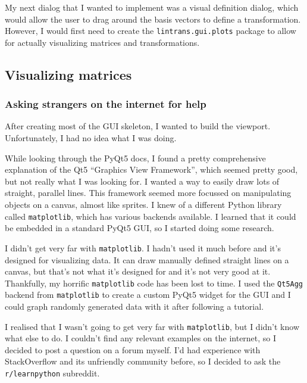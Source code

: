 \documentclass[../main.tex]{subfiles}
\begin{document}
My next dialog that I wanted to implement was a visual definition dialog, which would allow the user to drag around the basis vectors to define a transformation. However, I would first need to create the \texttt{lintrans.gui.plots} package to allow for actually visualizing matrices and transformations.

\subsection{Visualizing matrices\label{development:visualizing-matrices}}

\subsubsection{Asking strangers on the internet for help\label{development:visualizing-matrices:asking-strangers-on-the-internet-for-help}}

After creating most of the GUI skeleton, I wanted to build the viewport. Unfortunately, I had no idea what I was doing.

While looking through the PyQt5 docs, I found a pretty comprehensive explanation of the Qt5 \enquote{Graphics View Framework}\cite{pyqt5-graphics-view-framework}, which seemed pretty good, but not really what I was looking for. I wanted a way to easily draw lots of straight, parallel lines. This framework seemed more focussed on manipulating objects on a canvas, almost like sprites. I knew of a different Python library called \texttt{matplotlib}, which has various backends available. I learned that it could be embedded in a standard PyQt5 GUI, so I started doing some research.

I didn't get very far with \texttt{matplotlib}. I hadn't used it much before and it's designed for visualizing data. It can draw manually defined straight lines on a canvas, but that's not what it's designed for and it's not very good at it. Thankfully, my horrific \texttt{matplotlib} code has been lost to time. I used the \texttt{Qt5Agg} backend from \texttt{matplotlib} to create a custom PyQt5 widget for the GUI and I could graph randomly generated data with it after following a tutorial\cite{matplotlib-pyqt5-tutorial}.

I realised that I wasn't going to get very far with \texttt{matplotlib}, but I didn't know what else to do. I couldn't find any relevant examples on the internet, so I decided to post a question on a forum myself. I'd had experience with StackOverflow and its unfriendly community before, so I decided to ask the \texttt{r/learnpython} subreddit\cite{reddit-framework-question}.
\end{document}
